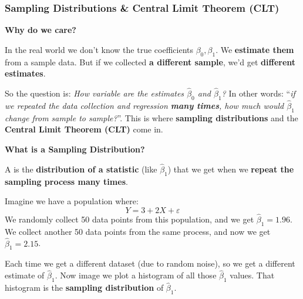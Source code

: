 \newpage

\subsubsection{Sampling Distributions \& Central Limit Theorem (CLT)}\label{subsubsection: Sampling Distributions and Central Limit Theorem (CLT)}

\begin{flushleft}
    \textcolor{Green3}{ \textbf{Why do we care?}}
\end{flushleft}
In the real world we don't know the true coefficients $\beta_0, \beta_1$. We \textbf{estimate them} from a sample data. But if we collected \textbf{a different sample}, we'd get \textbf{different estimates}.

\highspace
So the question is: \emph{How variable are the estimates $\hat{\beta}_0$ and $\hat{\beta}_1$?} In other words: ``\emph{if we repeated the data collection and regression \textbf{many times}, how much would $\hat{\beta}_1$ change from sample to sample?}''. This is where \textbf{sampling distributions} and the \textbf{Central Limit Theorem (CLT)} come in.

\highspace
\begin{flushleft}
    \textcolor{Green3}{ \textbf{What is a Sampling Distribution?}}
\end{flushleft}
A  is the \textbf{distribution of a statistic} (like $\hat{\beta}_1$) that we get when we \textbf{repeat the sampling process many times}.

\highspace
Imagine we have a population where:
\begin{equation*}
    Y = 3 + 2X + \varepsilon
\end{equation*}
We randomly collect 50 data points from this population, and we get $\hat{\beta}_1 = 1.96$. We collect another 50 data points from the same process, and now we get $\hat{\beta}_1 = 2.15$.

\highspace
Each time we get a different dataset (due to random noise), so we get a different estimate of $\hat{\beta}_1$. Now image we plot a histogram of all those $\hat{\beta}_1$ values. That histogram is the \textbf{sampling distribution} of $\hat{\beta}_1$.

